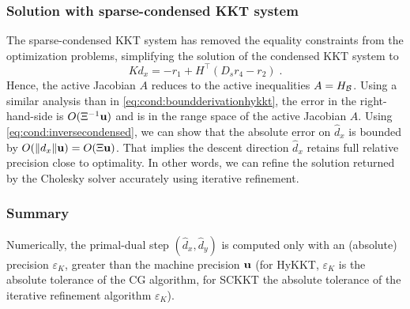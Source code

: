 \subsubsection{Solution with sparse-condensed KKT system}
The sparse-condensed KKT system has removed the equality
constraints from the optimization problems, simplifying
the solution of the condensed KKT system to
\begin{equation}
  \label{eq:cond:sckktstep}
  K d_x = -r_1 + H^\top (D_s r_4 - r_2) \; .
\end{equation}
Hence, the active Jacobian $A$ reduces to the active inequalities $A = H_{\mathcal{B}}$.
Using a similar analysis than in \eqref{eq:cond:boundderivationhykkt},
the error in the right-hand-side is $O(\Xi^{-1} \mathbf{u})$ and is in the
range space of the active Jacobian $A$. Using \eqref{eq:cond:inversecondensed},
we can show that the absolute error on $\widehat{d}_x$ is bounded by $O(\|d_x\| \mathbf{u})
= O(\Xi \mathbf{u})$. That implies the descent direction $\widehat{d}_x$ retains
full relative precision close to optimality.
In other words, we can refine the solution returned by the Cholesky solver accurately using
iterative refinement.

\subsubsection{Summary}
Numerically, the primal-dual step $(\widehat{d}_x, \widehat{d}_y)$
is computed only with an (absolute) precision $\varepsilon_{K}$,
greater than the machine precision $\mathbf{u}$ (for HyKKT, $\varepsilon_K$
is the absolute tolerance of the CG algorithm, for SCKKT the
absolute tolerance of the iterative refinement algorithm $\varepsilon_{K}$).

